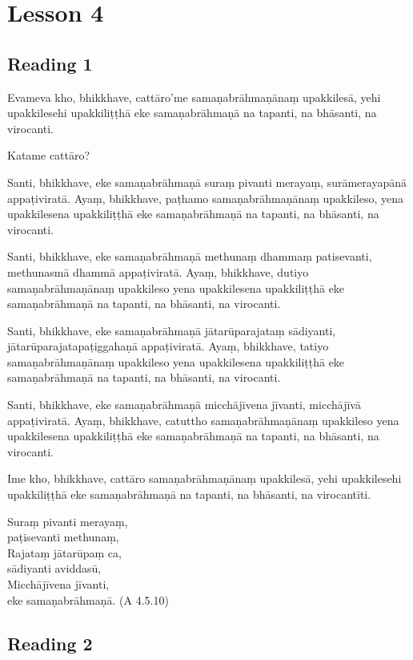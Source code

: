 \chapter{Lesson 4}

\section*{Reading 1}

Evameva kho, bhikkhave, cattāro’me samaṇabrāhmaṇānaṃ upakkilesā, yehi upakkilesehi upakkiliṭṭhā eke samaṇabrāhmaṇā na tapanti, na bhāsanti, na virocanti.

Katame cattāro?

Santi, bhikkhave, eke samaṇabrāhmaṇā suraṃ pivanti merayaṃ, surāmerayapānā appaṭiviratā. Ayaṃ, bhikkhave, paṭhamo samaṇabrāhmaṇānaṃ upakkileso, yena upakkilesena upakkiliṭṭhā eke samaṇabrāhmaṇā na tapanti, na bhāsanti, na virocanti.

Santi, bhikkhave, eke samaṇabrāhmaṇā methunaṃ dhammaṃ patisevanti, methunasmā dhammā appaṭiviratā. Ayaṃ, bhikkhave, dutiyo samaṇabrāhmaṇānaṃ upakkileso yena upakkilesena upakkiliṭṭhā eke samaṇabrāhmaṇā na tapanti, na bhāsanti, na virocanti.

Santi, bhikkhave, eke samaṇabrāhmaṇā jātarūparajataṃ sādiyanti, jātarūparajatapaṭiggahaṇā appaṭiviratā. Ayaṃ, bhikkhave, tatiyo samaṇabrāhmaṇānaṃ upakkileso yena upakkilesena upakkiliṭṭhā eke samaṇabrāhmaṇā na tapanti, na bhāsanti, na virocanti.

Santi, bhikkhave, eke samaṇabrāhmaṇā micchājīvena jīvanti, micchājīvā appaṭiviratā. Ayaṃ, bhikkhave, catuttho samaṇabrāhmaṇānaṃ upakkileso yena upakkilesena upakkiliṭṭhā eke samaṇabrāhmaṇā na tapanti, na bhāsanti, na virocanti.

Ime kho, bhikkhave, cattāro samaṇabrāhmaṇānaṃ upakkilesā, yehi upakkilesehi upakkiliṭṭhā eke samaṇabrāhmaṇā na tapanti, na bhāsanti, na virocantīti.

Suraṃ pivanti merayaṃ,\\
paṭisevanti methunaṃ,\\
Rajataṃ jātarūpaṃ ca,\\
sādiyanti aviddasū,\\
Micchājīvena jīvanti,\\
eke samaṇabrāhmaṇā. (A 4.5.10)

\section*{Reading 2}

